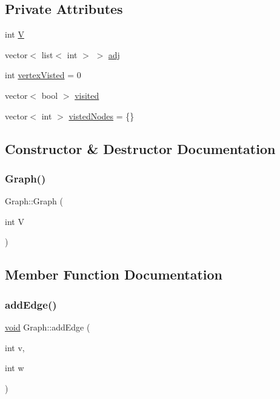 \subsection*{Private Attributes}
\begin{DoxyCompactItemize}
\item 
int \hyperlink{classGraph_a2b722f7cfa7a21e4cb5fae488b3d4dcc}{V}
\item 
vector$<$ list$<$ int $>$ $>$ \hyperlink{classGraph_a0bcadc2d6bda9074a2dabb77096f1a50}{adj}
\item 
int \hyperlink{classGraph_a4390b102c7989b10c39f9ed8297abdfc}{vertex\+Visted} = 0
\item 
vector$<$ bool $>$ \hyperlink{classGraph_a72f7d2d5c434ca7006cff083124e1ef2}{visited}
\item 
vector$<$ int $>$ \hyperlink{classGraph_a51d47fdc341faa7db5e4191ee29854cf}{visted\+Nodes} = \{\}
\end{DoxyCompactItemize}


\subsection{Constructor \& Destructor Documentation}
\mbox{\label{classGraph_af3ff6b295df8bf3bee0bafd7c7d56915}} 
\subsubsection{\texorpdfstring{Graph()}{Graph()}}
{\footnotesize\ttfamily Graph\+::\+Graph (\begin{DoxyParamCaption}\item[{int}]{V }\end{DoxyParamCaption})\hspace{0.3cm}{\ttfamily [inline]}}



\subsection{Member Function Documentation}
\mbox{\label{classGraph_a8a3b5afce00f9d260b01c188fbe73f53}} 
\subsubsection{\texorpdfstring{add\+Edge()}{addEdge()}}
{\footnotesize\ttfamily \hyperlink{imgui__impl__opengl3__loader_8h_ac668e7cffd9e2e9cfee428b9b2f34fa7}{void} Graph\+::add\+Edge (\begin{DoxyParamCaption}\item[{int}]{v,  }\item[{int}]{w }\end{DoxyParamCaption})\hspace{0.3cm}{\ttfamily [inline]}}

